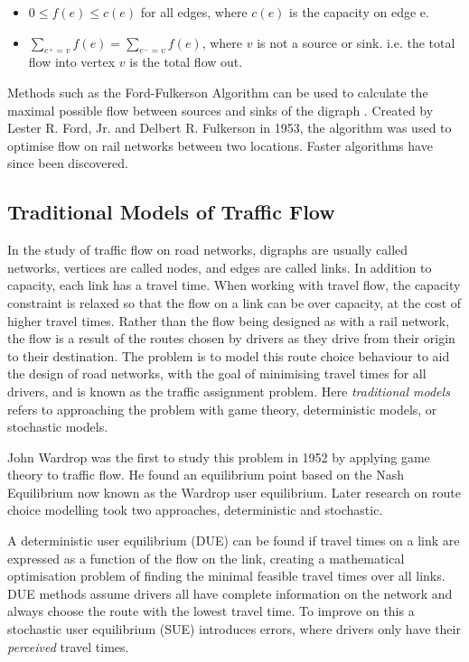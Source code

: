 \documentclass[12pt, a4paper, onecolumn]{article}
\begin{document}
\begin{itemize}
	\item $ 0 \leq f(e) \leq c(e)$ for all edges, where $c(e)$ is the capacity on edge e.
	\item $ \sum_{e^{+}=v} f(e) = \sum_{e^{-}=v} f(e)$, where $v$ is not a source or sink. i.e. the total flow into vertex $v$ is the total flow out.
	\end{itemize}

Methods such as the Ford-Fulkerson Algorithm can be used to calculate the maximal possible flow between sources and sinks of the digraph \citep{Ford1956}. Created by Lester R. Ford, Jr. and Delbert R. Fulkerson in 1953, the algorithm was used to optimise flow on rail networks between two locations. Faster algorithms have since been discovered.

\subsection{Traditional Models of Traffic Flow}
In the study of traffic flow on road networks, digraphs are usually called networks, vertices are called nodes, and edges are called links. In addition to capacity, each link has a travel time. When working with travel flow, the capacity constraint is relaxed so that the flow on a link can be over capacity, at the cost of higher travel times. Rather than the flow being designed as with a rail network, the flow is a result of the routes chosen by drivers as they drive from their origin to their destination. The problem is to model this route choice behaviour to aid the design of road networks, with the goal of minimising travel times for all drivers, and is known as the traffic assignment problem. Here \textit{traditional models} refers to approaching the problem with game theory, deterministic models, or stochastic models.

John Wardrop was the first to study this problem in 1952 \citep{Wardrop1952} by applying game theory to traffic flow. He found an equilibrium point based on the Nash Equilibrium now known as the Wardrop user equilibrium. Later research on route choice modelling took two approaches, deterministic and stochastic.

A deterministic user equilibrium (DUE) can be found if travel times on a link are expressed as a function of the flow on the link, creating a mathematical optimisation problem of finding the minimal feasible travel times over all links. DUE methods assume drivers all have complete information on the network and always choose the route with the lowest travel time. To improve on this a stochastic user equilibrium (SUE) introduces errors, where drivers only have their \textit{perceived} travel times. 
\end{document}
